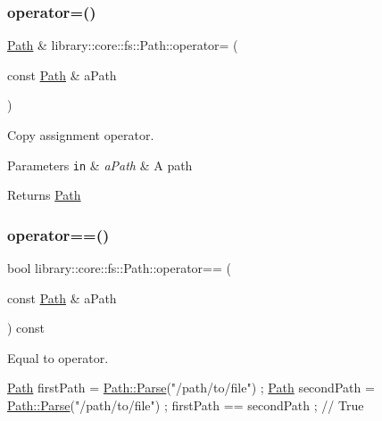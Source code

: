 \subsubsection{\texorpdfstring{operator=()}{operator=()}}
{\footnotesize\ttfamily \hyperlink{classlibrary_1_1core_1_1fs_1_1_path}{Path} \& library\+::core\+::fs\+::\+Path\+::operator= (\begin{DoxyParamCaption}\item[{const \hyperlink{classlibrary_1_1core_1_1fs_1_1_path}{Path} \&}]{a\+Path }\end{DoxyParamCaption})}



Copy assignment operator. 


\begin{DoxyParams}[1]{Parameters}
\mbox{\tt in}  & {\em a\+Path} & A path \\
\hline
\end{DoxyParams}
\begin{DoxyReturn}{Returns}
\hyperlink{classlibrary_1_1core_1_1fs_1_1_path}{Path} 
\end{DoxyReturn}
\mbox{\label{classlibrary_1_1core_1_1fs_1_1_path_add705556eb4509ab2868e322490a1e35}} 
\subsubsection{\texorpdfstring{operator==()}{operator==()}}
{\footnotesize\ttfamily bool library\+::core\+::fs\+::\+Path\+::operator== (\begin{DoxyParamCaption}\item[{const \hyperlink{classlibrary_1_1core_1_1fs_1_1_path}{Path} \&}]{a\+Path }\end{DoxyParamCaption}) const}



Equal to operator. 


\begin{DoxyCode}
\hyperlink{classlibrary_1_1core_1_1fs_1_1_path_aabc4240fc08479d1bff6b9753f2b5cc2}{Path} firstPath = \hyperlink{classlibrary_1_1core_1_1fs_1_1_path_a6ba644b6609507e724c217bf2020f5ae}{Path::Parse}(\textcolor{stringliteral}{"/path/to/file"}) ;
\hyperlink{classlibrary_1_1core_1_1fs_1_1_path_aabc4240fc08479d1bff6b9753f2b5cc2}{Path} secondPath = \hyperlink{classlibrary_1_1core_1_1fs_1_1_path_a6ba644b6609507e724c217bf2020f5ae}{Path::Parse}(\textcolor{stringliteral}{"/path/to/file"}) ;
firstPath == secondPath ; \textcolor{comment}{// True}
\end{DoxyCode}




